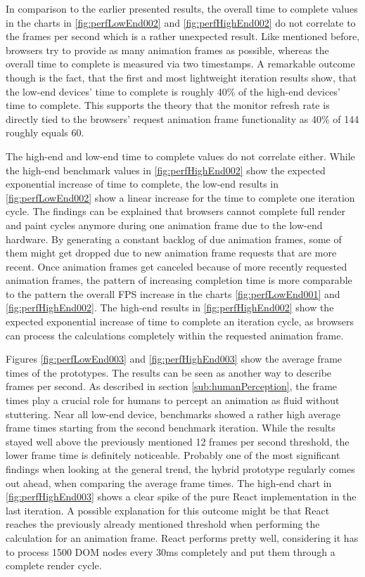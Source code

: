 In comparison to the earlier presented results, the overall time to complete values in the charts in \ref{fig:perfLowEnd002} and \ref{fig:perfHighEnd002} do not correlate to the frames per second which is a rather unexpected result. Like mentioned before, browsers try to provide as many animation frames as possible, whereas the overall time to complete is measured via two timestamps. A remarkable outcome though is the fact, that the first and most lightweight iteration results show, that the low-end devices' time to complete is roughly 40\% of the high-end devices' time to complete. This supports the theory that the monitor refresh rate is directly tied to the browsers' request animation frame functionality as 40\% of 144 roughly equals 60. 

The high-end and low-end time to complete values do not correlate either. While the high-end benchmark values in \ref{fig:perfHighEnd002} show the expected exponential increase of time to complete, the low-end results in \ref{fig:perfLowEnd002} show a linear increase for the time to complete one iteration cycle. The findings can be explained that browsers cannot complete full render and paint cycles anymore during one animation frame due to the low-end hardware. By generating a constant backlog of due animation frames, some of them might get dropped due to new animation frame requests that are more recent. Once animation frames get canceled because of more recently requested animation frames, the pattern of increasing completion time is more comparable to the pattern the overall FPS increase in the charts \ref{fig:perfLowEnd001} and \ref{fig:perfHighEnd002}. The high-end results in \ref{fig:perfHighEnd002} show the expected exponential increase of time to complete an iteration cycle, as browsers can process the calculations completely within the requested animation frame.

Figures \ref{fig:perfLowEnd003} and \ref{fig:perfHighEnd003} show the average frame times of the prototypes. The results can be seen as another way to describe frames per second. As described in section \ref{sub:humanPerception}, the frame times play a crucial role for humans to percept an animation as fluid without stuttering. Near all low-end device, benchmarks showed a rather high average frame times starting from the second benchmark iteration. While the results stayed well above the previously mentioned 12 frames per second threshold, the lower frame time is definitely noticeable. Probably one of the most significant findings when looking at the general trend, the hybrid prototype regularly comes out ahead, when comparing the average frame times. The high-end chart in \ref{fig:perfHighEnd003} shows a clear spike of the pure React implementation in the last iteration. A possible explanation for this outcome might be that React reaches the previously already mentioned threshold when performing the calculation for an animation frame. React performs pretty well, considering it has to process 1500 DOM nodes every 30ms completely and put them through a complete render cycle.

